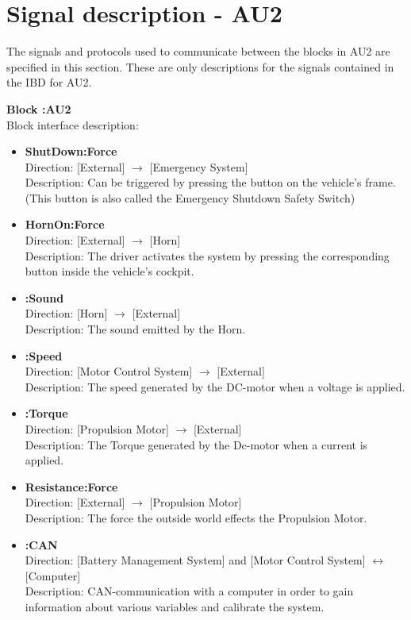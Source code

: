 \section{Signal description - AU2}
The signals and protocols used to communicate between the blocks in AU2 are specified in this section. These are only descriptions for the signals contained in the IBD for AU2.

\textbf{Block :AU2}\\
Block interface description:
\begin{itemize}
	\item \textbf{ShutDown:Force}\\
	Direction: [External] $\rightarrow$ [Emergency System]\\
	Description: Can be triggered by pressing the button on the vehicle's frame. (This button is also called the Emergency Shutdown Safety Switch)	
	\item \textbf{HornOn:Force}\\
	Direction: [External] $\rightarrow$ [Horn]\\
	Description: The driver activates the system by pressing the corresponding button inside the vehicle's cockpit.
	\item \textbf{:Sound}\\
	Direction: [Horn] $\rightarrow$ [External]\\
	Description: The sound emitted by the Horn.
	\item \textbf{:Speed}\\
	Direction: [Motor Control System] $\rightarrow$ [External]\\
	Description: The speed generated by the DC-motor when a voltage is applied.
	\item \textbf{:Torque}\\
	Direction: [Propulsion Motor] $\rightarrow$ [External]\\
	Description: The Torque generated by the Dc-motor when a current is applied. 
	\item \textbf{Resistance:Force}\\
	Direction: [External] $\rightarrow$ [Propulsion Motor]\\
	Description: The force the outside world effects the Propulsion Motor.
	\item \textbf{:CAN}\\
	Direction: [Battery Management System] and [Motor Control System] $\leftrightarrow$ [Computer]\\
	Description: CAN-communication with a computer in order to gain information about various variables and calibrate the system.

\end{itemize}
